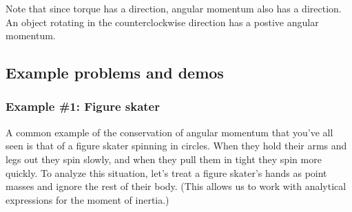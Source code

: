 Note that since torque has a direction, angular momentum also has a direction. An object rotating in the counterclockwise direction has a postive angular momentum.




\subsection{Example problems and demos}
\subsubsection*{Example \#1: Figure skater}
A common example of the conservation of angular momentum that you've all seen is that of a figure skater spinning in circles. When they hold their arms and legs out they spin slowly, and when they pull them in tight they spin more quickly. To analyze this situation, let's treat a figure skater's hands as point masses and ignore the rest of their body. (This allows us to work with analytical expressions for the moment of inertia.)


